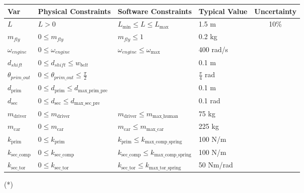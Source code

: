 \documentclass[12pt]{article}
\begin{document}
\begin{table}[!h]
  \caption{Input Variables} \label{TblInputVar}
  \renewcommand{\arraystretch}{1.2}
\noindent \begin{longtable*}{l l l l c} 
  \toprule
  \textbf{Var} & \textbf{Physical Constraints} & \textbf{Software Constraints} &
                             \textbf{Typical Value} & \textbf{Uncertainty}\\
  \midrule 
  $L$ & $L > 0$ & $L_{\text{min}} \leq L \leq L_{\text{max}}$ & 1.5 \si[per-mode=symbol] {\metre} & 10\%\\
  $m_{fly}$ & $0 \leq m_{fly}$ & $m_{fly} \leq 1$ & 0.2 kg\\
  $\omega_{engine}$ & $0 \leq \omega_{engine}$ & $\omega_{engine} \leq \omega_\text{max}$ & 400 rad/s\\
  $d_{shift}$ & $0 \leq d_{shift} \leq w_{belt}$ & & 0.1 m\\
  $\theta_{prim\_out}$ & $0 \leq \theta_{prim\_out} \leq \frac{\pi}{2}$ & & $\frac{\pi}{4}$ rad\\
  $d_{\text{prim}}$ & $0 \leq d_{\text{prim}} \leq d_\text{max\_prim\_pre}$ & & 0.1 m\\
  $d_{\text{sec}}$ & $0 \leq d_{\text{sec}} \leq d_\text{max\_sec\_pre}$ & & 0.1 rad\\
  $m_{\text{driver}}$ & $0 \leq m_{\text{driver}}$ & $ m_{\text{driver}} \leq m_\text{max\_human}$ & 75 kg\\
  $m_{\text{car}}$ & $0 \leq m_{\text{car}}$ & $m_{\text{car}} \leq m_\text{max\_car}$ & 225 kg\\
  $k_{\text{prim}}$ & $0 \leq k_{\text{prim}}$ & $k_{\text{prim}} \leq k_\text{max\_comp\_spring}$ & 100 N/m\\
  $k_{\text{sec\_comp}}$ & $0 \leq k_{\text{sec\_comp}}$ & $k_{\text{sec\_comp}} \leq k_\text{max\_comp\_spring}$ & 100 N/m\\
  $k_{\text{sec\_tor}}$ & $0 \leq k_{\text{sec\_tor}}$ & $k_{\text{sec\_tor}} \leq k_\text{max\_tor\_spring}$ & 50 Nm/rad\\
  \bottomrule
\end{longtable*}
\end{table}

\noindent 
\begin{description}
\item[(*)] 
\end{description}
\end{document}
